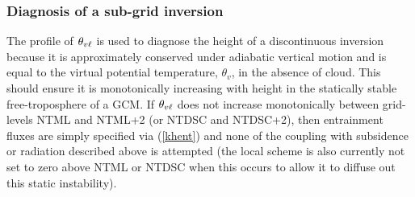 \documentclass{UMDP_article}
\begin{document}
\subsubsection{Diagnosis of a sub-grid inversion}
\label{sec:sginv}

The profile of $\theta_{v\ell}$ is used to diagnose the height of a
discontinuous inversion because it is approximately conserved under
adiabatic vertical motion and is equal to the virtual potential
temperature, $\theta_v$, in the absence of cloud.  This should ensure
it is monotonically increasing with height in the statically stable
free-troposphere of a GCM.  If $\theta_{v\ell}$ does not increase
monotonically between grid-levels NTML and NTML+2 (or NTDSC and
NTDSC+2), then entrainment fluxes are simply specified via
(\ref{khent}) and none of the coupling with subsidence or radiation
described above is attempted (the local scheme is also currently not
set to zero above NTML or NTDSC when this occurs to allow it to
diffuse out this static instability).
\end{document}

